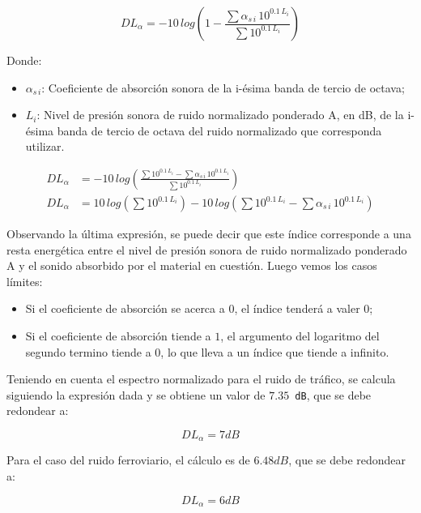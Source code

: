 		\begin{equation}
			DL_{\alpha} = -10\,log\left(1- \frac{\sum \alpha_{s\,i}\,10^{0.1\,L_i}}{\sum 10^{0.1\,L_i}}\right)
		\end{equation}
	
		Donde:
		\begin{itemize}
			\item $\alpha_{s\,i}$: Coeficiente de absorción sonora de la i-ésima banda de tercio de octava;
			\item $L_i$: Nivel de presión sonora de ruido normalizado ponderado A, en dB, de la i-ésima banda de tercio de octava del ruido normalizado que corresponda utilizar.
		\end{itemize}
		
		\begin{align}
			DL_{\alpha} &= -10\,log\left(\frac{\sum 10^{0.1\,L_i} - \sum \alpha_{s\,i}\,10^{0.1\,L_i}}{\sum 10^{0.1\,L_i}}\right)\\
			DL_{\alpha} &= 10\,log\left(\sum 10^{0.1\,L_i}\right) - 10\,log\left(\sum 10^{0.1\,L_i} - \sum \alpha_{s\,i}\,10^{0.1\,L_i}\right)
		\end{align}
			
		Observando la última expresión, se puede decir que este índice corresponde a una resta energética entre el nivel de presión sonora de ruido normalizado ponderado A y el sonido absorbido por el material en cuestión. Luego vemos los casos límites:
		
		\begin{itemize}
			\item Si el coeficiente de absorción se acerca a $0$, el índice tenderá a valer 0;
			\item Si el coeficiente de absorción tiende a $1$, el argumento del logaritmo del segundo termino tiende a 0, lo que lleva a un índice que tiende a infinito.
		\end{itemize}
		
		Teniendo en cuenta el espectro normalizado para el ruido de tráfico, se calcula siguiendo la expresión dada y se obtiene un valor de \texttt{$7.35$ dB}, que se debe redondear a:
		
		\begin{equation*}
			\boxed{DL_{\alpha} = 7 dB}
		\end{equation*}
			
		Para el caso del ruido ferroviario, el cálculo es de \texttt{$6.48 dB$}, que se debe redondear a:

		\begin{equation*}
			\boxed{DL_{\alpha} = 6 dB}
		\end{equation*}	
		
